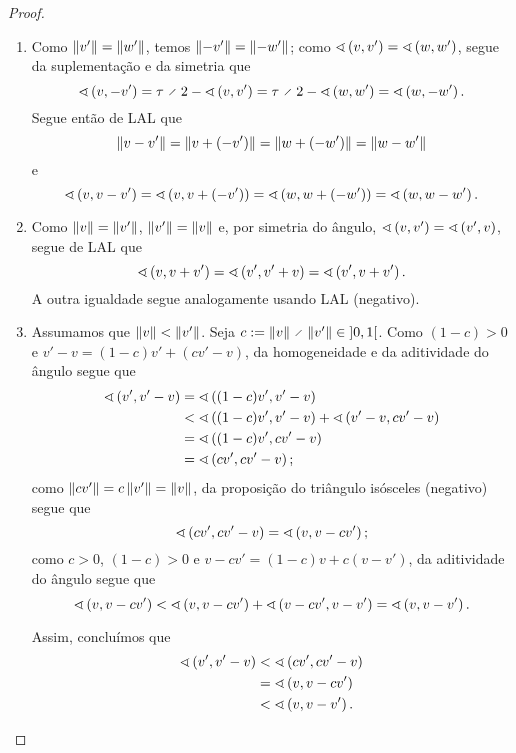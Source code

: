 \begin{proof}
	\begin{enumerate}
	\item Como $\nor{v'}=\nor{w'}$, temos $\nor{-v'}=\nor{-w'}$; como $\ang{v}{v'}=\ang{w}{w'}$, segue da suplementação e da simetria que
		\begin{equation*}
		\ang{v}{-v'} = \tau \div 2 - \ang{v}{v'} = \tau \div 2 - \ang{w}{w'} = \ang{w}{-w'}.
		\end{equation*}
	Segue então de LAL que
		\begin{equation*}
		\nor{v-v'} = \nor{v+(-v')} = \nor{w+(-w')} = \nor{w-w'}
		\end{equation*}
	e
		\begin{equation*}
		\ang{v}{v-v'} = \ang{v}{v+(-v')} = \ang{w}{w+(-w')} = \ang{w}{w-w'}.
		\end{equation*}

	\item Como $\nor{v}=\nor{v'}$, $\nor{v'}=\nor{v}$ e, por simetria do ângulo, $\ang{v}{v'} = \ang{v'}{v}$, segue de LAL que
		\begin{equation*}
			\ang{v}{v+v'} = \ang{v'}{v'+v} = \ang{v'}{v+v'}.
		\end{equation*}
	A outra igualdade segue analogamente usando LAL (negativo).
	
	\item Assumamos que $\nor{v} < \nor{v'}$. Seja $c := \nor{v} \div \nor{v'} \in \intaa{0}{1}$. Como $(1-c)>0$ e $v'-v = (1-c)v'+(cv'-v)$, da homogeneidade e da aditividade do ângulo segue que
		\begin{align*}
		\ang{v'}{v'-v}&= \ang{(1-c)v'}{v'-v} \\
			&< \ang{(1-c)v'}{v'-v} + \ang{v'-v}{cv'-v} \\
			&= \ang{(1-c)v'}{cv'-v} \\
			&= \ang{cv'}{cv'-v};
		\end{align*}
	como $\nor{cv'}=c\nor{v'}=\nor{v}$, da proposição do triângulo isósceles (negativo) segue que
		\begin{equation*}
		\ang{cv'}{cv'-v} = \ang{v}{v-cv'};
		\end{equation*}
	como $c>0$, $(1-c) > 0$ e $v-cv' = (1-c)v + c(v-v')$, da aditividade do ângulo segue que
		\begin{equation*}
		\ang{v}{v-cv'} < \ang{v}{v-cv'} + \ang{v-cv'}{v-v'} = \ang{v}{v-v'}.
		\end{equation*}

	Assim, concluímos que
		\begin{align*}
		\ang{v'}{v'-v} &< \ang{cv'}{cv'-v} \\
			&= \ang{v}{v-cv'} \\
			&< \ang{v}{v-v'}.
		\end{align*}


\end{enumerate}
\end{proof}
